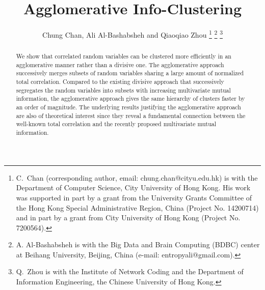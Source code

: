 \documentclass[letterpaper,onecolumn,draftcls]{IEEEtran}
\title{Agglomerative Info-Clustering}
\author{Chung Chan, Ali Al-Bashabsheh and Qiaoqiao Zhou
	\thanks{C.\ Chan (corresponding author, email:
          chung.chan@cityu.edu.hk) is with the Department of Computer Science, City University of Hong Kong. His work was supported in part by a grant
          from the University Grants Committee of the Hong Kong Special Administrative Region,
          China (Project No. 14200714) and in part by a grant from
          City University of Hong Kong (Project No. 7200564).}
        \thanks{A. Al-Bashabsheh is with the Big Data and Brain
          Computing (BDBC) center at Beihang University, Beijing, China (e-mail:
          entropyali@gmail.com).}
        \thanks{Q.\ Zhou is with the Institute of Network Coding and the Department of Information Engineering, the Chinese University of Hong Kong.
	}
	}
\begin{document}

%
\IEEEoverridecommandlockouts
\maketitle

\begin{abstract}
We show that correlated random variables can be clustered more efficiently in an agglomerative manner rather than a divisive one. The agglomerative approach successively merges subsets of random variables sharing a large amount of normalized total correlation. Compared to the existing divisive approach that successively segregates the random variables into subsets with increasing multivariate mutual information, the agglomerative approach gives the same hierarchy of clusters faster by an order of magnitude.  The underlying results justifying the agglomerative approach are also of theoretical interest since they reveal a fundamental connection between the well-known total correlation and the recently proposed multivariate mutual information.
\end{abstract} 






\end{document}
